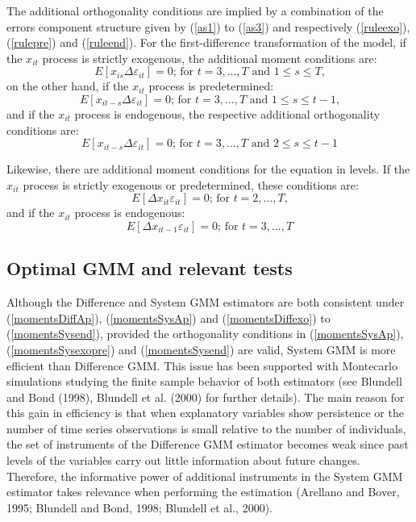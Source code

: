 \documentclass[12pt,a4paper,english]{article}%
\begin{document}
The additional orthogonality conditions are implied by a combination of the errors component structure given by (\ref{as1}) to (\ref{as3}) and respectively (\ref{ruleexo}), (\ref{rulepre}) and (\ref{ruleend}). For the first-difference transformation of the model, if the $x_{it}$ process is strictly exogenous, the additional moment conditions are:
\begin{equation}
\label{momentsDiffexo}
\tag{12'}
E\left[x_{is}\Delta \varepsilon_{it}\right]=0 \text{; for $t=3,...,T$ and $1\leq s \leq T$,}
\end{equation}
on the other hand, if the $x_{it}$ process is predetermined:
\begin{equation}
\label{momentsDiffpre}
\tag{13'}
E\left[x_{it-s}\Delta \varepsilon_{it}\right]=0 \text{; for $t=3,...,T$ and $1\leq s\leq t-1$,}
\end{equation}
and if the $x_{it}$ process is endogenous, the respective additional orthogonality conditions are:
\begin{equation}
\label{momentsDiffend}
\tag{14'}
E\left[x_{it-s}\Delta \varepsilon_{it}\right]=0 \text{; for $t=3,...,T$ and $2\leq s \leq t-1$}
\end{equation}

Likewise, there are additional moment conditions for the equation in levels. If the $x_{it}$ process is strictly exogenous or predetermined, these conditions are:
\begin{equation}
\label{momentsSysexopre}
\tag{15'}
E\left[\Delta x_{it}\varepsilon_{it}\right]=0 \text{; for $t=2,...,T$,}
\end{equation}
and if the $x_{it}$ process is endogenous:
\begin{equation}
\label{momentsSysend}
\tag{16'}
E\left[\Delta x_{it-1}\varepsilon_{it}\right]=0 \text{; for $t=3,...,T$}
\end{equation}

\subsection*{Optimal GMM and relevant tests}

Although the Difference and System GMM estimators are both consistent under (\ref{momentsDiffAp}), (\ref{momentsSysAp}) and (\ref{momentsDiffexo}) to (\ref{momentsSysend}), provided the orthogonality conditions in (\ref{momentsSysAp}), (\ref{momentsSysexopre}) and (\ref{momentsSysend}) are valid,  System GMM is more efficient than Difference GMM. This issue has been supported with Montecarlo simulations studying the finite sample behavior of both estimators (see Blundell and Bond (1998), Blundell et al. (2000) for further details). The main reason for this gain in efficiency is that when explanatory variables show persistence or the number of time series observations is small relative to the number of individuals, the set of instruments of the Difference GMM estimator becomes weak since past levels of the variables carry out little information about future changes. Therefore, the informative power of additional instruments in the System GMM estimator takes relevance when performing the estimation (Arellano and Bover, 1995; Blundell and Bond, 1998; Blundell et al., 2000).
\end{document}
